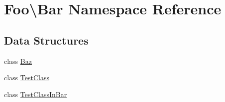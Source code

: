 \hypertarget{namespace_foo_1_1_bar}{}\section{Foo\textbackslash{}Bar Namespace Reference}
\label{namespace_foo_1_1_bar}
\subsection*{Data Structures}
\begin{DoxyCompactItemize}
\item 
class \mbox{\hyperlink{class_foo_1_1_bar_1_1_baz}{Baz}}
\item 
class \mbox{\hyperlink{class_foo_1_1_bar_1_1_test_class}{Test\+Class}}
\item 
class \mbox{\hyperlink{class_foo_1_1_bar_1_1_test_class_in_bar}{Test\+Class\+In\+Bar}}
\end{DoxyCompactItemize}
